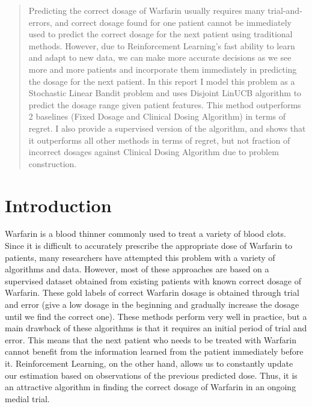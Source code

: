 \documentclass{article}
\begin{document}
\begin{abstract}
	Predicting the correct dosage of Warfarin usually requires many trial-and-errors, and correct dosage found for one patient cannot be immediately used to predict the correct dosage for the next patient using traditional methods. However, due to Reinforcement Learning's fast ability to learn and adapt to new data, we can make more accurate decisions as we see more and more patients and incorporate them immediately in predicting the dosage for the next patient. In this report I model this problem as a Stochastic Linear Bandit problem and uses Disjoint LinUCB algorithm to predict the dosage range given patient features. This method outperforms 2 baselines (Fixed Dosage and Clinical Dosing Algorithm) in terms of regret. I also provide a supervised version of the algorithm, and shows that it outperforms all other methods in terms of regret, but not fraction of incorrect dosages against Clinical Dosing Algorithm due to problem construction. 
\end{abstract}

\section{Introduction}
Warfarin is a blood thinner commonly used to treat a variety of blood clots. Since it is difficult to accurately prescribe the appropriate dose of Warfarin to patients, many researchers have attempted this problem with a variety of algorithms and data. \cite{international2009estimation} However, most of these approaches are based on a supervised dataset obtained from existing patients with known correct dosage of Warfarin. These gold labels of correct Warfarin dosage is obtained through trial and error (give a low dosage in the beginning and gradually increase the dosage until we find the correct one). These methods perform very well in practice, but a main drawback of these algorithms is that it requires an initial period of trial and error. This means that the next patient who needs to be treated with Warfarin cannot benefit from the information learned from the patient immediately before it. Reinforcement Learning, on the other hand, allows us to constantly update our estimation based on observations of the previous predicted dose. Thus, it is an attractive algorithm in finding the correct dosage of Warfarin in an ongoing medial trial.
\end{document}
